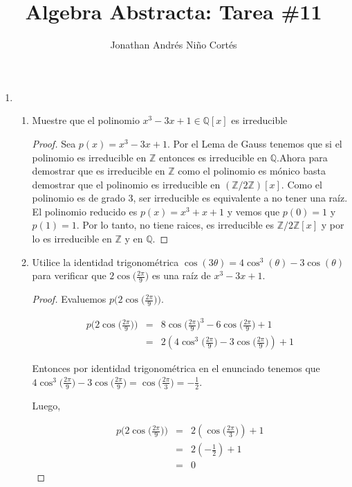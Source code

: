 \documentclass[letter,twoside,12pt]{article}
\title{Algebra Abstracta: Tarea \#11}
\author{Jonathan Andrés Niño Cortés}
\begin{document}
\maketitle
\begin{enumerate}
\item \begin{enumerate}
\item Muestre que el polinomio $ x^3 - 3x + 1 \in \mathbb{Q}[x] $ es irreducible

\begin{proof}

Sea $ p(x) = x^3-3x+1$.
Por el Lema de Gauss tenemos que si el polinomio es irreducible en $ \mathbb{Z} $ entonces es irreducible en $ \mathbb{Q} $.Ahora para demostrar que es irreducible en $ \mathbb{Z} $ como el polinomio es mónico basta demostrar que el polinomio es irreducible en $ (\mathbb{Z}/2\mathbb{Z})[x] $. Como el polinomio es de grado 3, ser irreducible es equivalente a no tener una raíz. El polinomio reducido es $ p(x)=x^3+x+1 $ y vemos que $ p(0)=1 $ y $ p(1)=1 $. Por lo tanto, no tiene raices, es irreducible es $ \mathbb{Z}/2\mathbb{Z}[x] $ y por lo es irreducible en $ \mathbb{Z} $ y en $ \mathbb{Q} $.
\end{proof}

\item Utilice la identidad trigonométrica $ \cos(3\theta) = 4 \cos^3(\theta)-3 \cos(\theta) $ para verificar que $ 2\displaystyle\cos\Big(\frac{2\pi}{9}\Big) $ es una raíz de $ x^3 - 3x + 1 $.

\begin{proof}
Evaluemos $ \displaystyle p\Big(2\cos\Big(\frac{2\pi}{9}\Big)\Big)$.

\begin{eqnarray}
p\Big(2\cos\Big(\frac{2\pi}{9}\Big)\Big)&=&8\cos\Big(\frac{2\pi}{9}\Big)^3-6\cos\Big(\frac{2\pi}{9}\Big)+1\nonumber
\\&=&2(4\cos^3\Big(\frac{2\pi}{9}\Big)-3\cos\Big(\frac{2\pi}{9}\Big))+1\nonumber
\end{eqnarray}

Entonces por identidad trigonométrica en el enunciado tenemos que $ \displaystyle 4\cos^3\Big(\frac{2\pi}{9}\Big)-3\cos\Big(\frac{2\pi}{9}\Big)= \cos\Big(\frac{2\pi}{3}\Big)=-\frac{1}{2} $.

Luego,

\begin{eqnarray}
p\Big(2\cos\Big(\frac{2\pi}{9}\Big)\Big)&=&2(\cos\Big(\frac{2\pi}{3}\Big))+1\nonumber
\\&=& 2(-\frac{1}{2})+1 \nonumber
\\&=&0 \nonumber
\end{eqnarray}
\end{proof}


\end{enumerate}
\end{enumerate}
\end{document}
